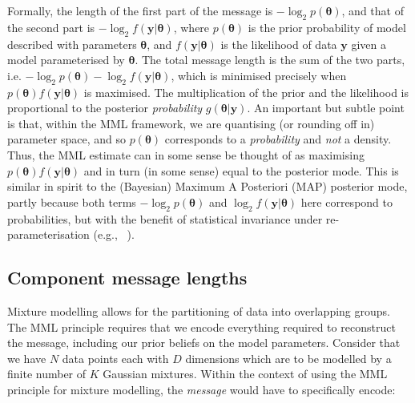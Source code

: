 \documentclass{elsarticle}
\newcommand{\vect}[1]{\boldsymbol{\mathbf{#1}}}
\renewcommand{\vec}[1]{\vect{#1}}
\def\datum{y}
\def\data{\vect{\datum}}
\newcommand{\prior}[1]{p\left(#1\right)}
\begin{document}
Formally, the length of the first part of the message is
    $-\log_{2}\prior{\vec{\theta}}$, 
and that of the second part is 
    $-\log_{2}f(\vec{\data}|\vec{\theta})$, 
where $\prior{\vec{\theta}}$ is the prior probability of model described with 
parameters $\vec{\theta}$, and 
    $f(\vec{\data}|\vec{\theta})$ 
is the likelihood of data $\vec{\data}$ given a model parameterised by $\vec{\theta}$. 
The total message length is the sum of the two parts, i.e. 
    $-\log_{2} \prior{\vec{\theta}} - \log_{2}f(\vec{\data} | \vec{\theta})$, 
which is minimised precisely when $\prior{\vec{\theta}} f(\vec{\data}|\vec{\theta})$
is maximised. The multiplication of the prior and the likelihood is 
proportional to the posterior {\em probability} $g(\vec{\theta}|\vec{\data})$. 
An important but subtle point is that, within the MML framework, we are 
quantising (or rounding off in) parameter space, and so 
$\prior{\vec{\theta}}$ corresponds to a {\em probability} and {\em not} 
a density. Thus, the MML estimate can in some sense be thought of as maximising 
    $\prior{\vec{\theta}}f(\vec{\data}|\vec{\theta})$ 
and in turn (in some sense) equal to the posterior mode. This is similar in 
spirit to the (Bayesian) Maximum A Posteriori (MAP) posterior mode, partly 
because both terms 
    $-\log_{2}\prior{\vec{\theta}}$
and 
    $\log_{2} f(\vec{\data}|\vec{\theta})$ 
here correspond to probabilities, but with the benefit of statistical 
invariance under re-parameterisation (e.g., ~\cite{WallaceFreeman1987,WallaceDowe1999a,Wallace05,dowe2007bayes}).


\subsection{Component message lengths}

Mixture modelling allows for the partitioning of data into overlapping groups.
The MML principle requires that we encode everything required to reconstruct 
the message, including our prior beliefs on the model parameters. Consider 
that we have $N$ data points each with $D$ dimensions which are to be modelled 
by a finite number of $K$ Gaussian mixtures. Within the context of using the 
MML principle for mixture modelling, the \emph{message} would have to 
specifically encode:
\end{document}
